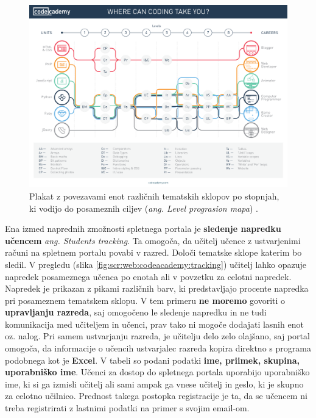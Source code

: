 \begin{figure}[h!]
  \centering
    \includegraphics [width=1\linewidth, keepaspectratio =
   1] {./images/CAdemy-poster.pdf}
   \caption{Plakat z povezavami enot različnih tematskih sklopov po
     stopnjah, ki vodijo  do posameznih ciljev (\emph{ang. Level
       prograsion mapa}) \cite{web:codeacademy}.}
    \label{fig:codeacademy:poster}
\end{figure}

Ena izmed naprednih zmožnosti spletnega portala je \textbf{sledenje
  napredku učencem} \emph{ang. Students tracking}. Ta omogoča, da
učitelj učence z ustvarjenimi računi na spletnem portalu povabi v
razred. Določi tematske sklope katerim bo sledil. V pregledu (slika
\ref{fig:scr:web:codeacademy:tracking}) učitelj lahko opazuje napredek
posameznega učenca po enotah ali v povzetku za celotni
napredek. Napredek je prikazan z pikami različnih barv, ki
predstavljajo procente napredka pri posameznem tematskem sklopu. V tem
primeru \textbf{ne moremo} govoriti o \textbf{upravljanju razreda},
saj omogočeno le sledenje napredku in ne tudi komunikacija med
učiteljem in učenci, prav tako ni mogoče dodajati lasnih enot
oz. nalog. Pri samem ustvarjanju razreda, je učitelju delo zelo
olajšano, saj portal omogoča, da informacije o učencih ustvarjalec
razreda kopira direktno s programa podobnega kot je \textbf{Excel}. V
tabeli so podani podatki \textbf{ime, priimek, skupina, uporabniško
  ime}. Učenci za dostop do spletnega portala uporabijo uporabniško
ime, ki si ga izmisli učitelj ali sami ampak ga vnese učitelj in
geslo, ki je skupno za celotno učilnico. Prednost takega postopka
registracije je ta, da se učencem ni treba registrirati z lastnimi
podatki na primer s svojim email-om.

